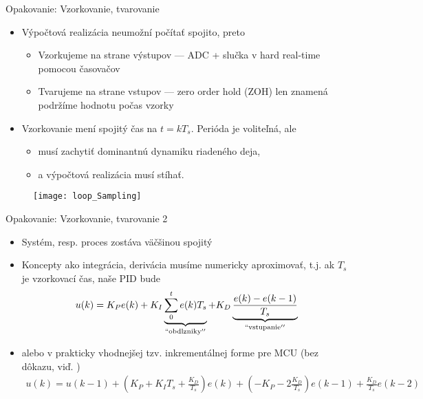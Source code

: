 \begin{frame}[t]{Opakovanie: Vzorkovanie, tvarovanie}
  \begin{itemize}
  \item<1-> Výpočtová realizácia neumožní počítať spojito, preto
    \begin{itemize}
      \item Vzorkujeme na strane výstupov --- ADC + slučka v hard real-time pomocou časovačov
      \item Tvarujeme na strane vstupov --- zero order hold (ZOH) len znamená podržíme hodnotu počas vzorky
    \end{itemize}
  \item<2-> Vzorkovanie mení spojitý čas na $t=kT_s$. Perióda je voliteľná, ale
    \begin{itemize}
      \item musí zachytiť dominantnú dynamiku riadeného deja,
      \item a výpočtová realizácia musí stíhať.
  \end{itemize}
\end{itemize}
\begin{figure}
\centering
  \texttt{[image: loop\_Sampling]}\\
\end{figure}
\end{frame}


\begin{frame}[t]{Opakovanie: Vzorkovanie, tvarovanie 2}
  \begin{itemize}
    \item<1-> Systém, resp. proces zostáva väčšinou spojitý
    \item<2-> Koncepty ako integrácia, derivácia musíme numericky aproximovať, t.j. ak $T_s$ je vzorkovací čas, naše PID bude
        \begin{align}
        u(k)= K_Pe(k)+K_I\underbrace{\sum_0^te(k)T_s}_{\mathrm{``obdlzniky''}}+K_D\underbrace{\frac{e(k)-e(k-1)}{T_s}}_{\mathrm{``vstupanie''}}
        \end{align}
    \item<3->  alebo v prakticky vhodnejšej tzv. inkrementálnej forme pre MCU (bez dôkazu, viď. \cite{W:PID})
        {\tiny
        \begin{align}
        u(k)=u(k-1)+\left(K_P+K_IT_s+\frac{K_D}{T_s}\right)e(k)+\left(-K_P -2\frac{K_D}{T_s}\right)e(k-1)+\frac{K_D}{T_s}e(k-2)
         \end{align}
         }
\end{itemize}
\end{frame}





% 
